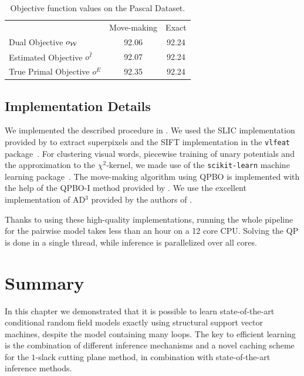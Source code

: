 \begin{table}
    \begin{center}
    \begin{tabularx}{\linewidth}{@{\extracolsep{\fill}}lcc}
    \toprule
                    & Move-making & Exact \\
    \cmidrule{1-3}
    Dual Objective $o_{\mathcal{W}}$ &92.06& 92.24\\
    Estimated Objective $o^{\hat{I}}$ & 92.07 &92.24\\
    True Primal Objective $o^E$&92.35& 92.24  \\
    \bottomrule
    \end{tabularx}
    \end{center}
    \caption{Objective function values on the Pascal Dataset.}
\end{table}


\subsection{Implementation Details}
We implemented the described procedure in \pystruct.
We used the SLIC implementation provided by \citet{achanta2012slic} to extract superpixels and
the SIFT implementation in the \texttt{vlfeat} package~\citep{vedaldi08vlfeat}.
For clustering visual words, piecewise training of unary potentials and the
approximation to the $\chi^2$-kernel, we made use of the \texttt{scikit-learn}
machine learning package~\citep{pedregosa2011scikit}.
The move-making algorithm using QPBO is implemented with the help of the QPBO-I
method provided by \citet{rother2007optimizing}.
We use the excellent implementation of AD$^3$ provided by the authors of
\citet{martins2011augmented}. 

Thanks to using these high-quality implementations, running the whole pipeline
for the pairwise model takes less than an hour on a 12 core CPU\@. Solving the
QP is done in a single thread, while inference is parallelized over all cores.
 
\section{Summary}
In this chapter we demonstrated that it is possible to learn state-of-the-art
conditional random field models exactly using structural support vector
machines, despite the model containing many loops.  The key to efficient
learning is the combination of different inference mechanisms and a novel
caching scheme for the $1$-slack cutting plane method, in combination with
state-of-the-art inference methods.


